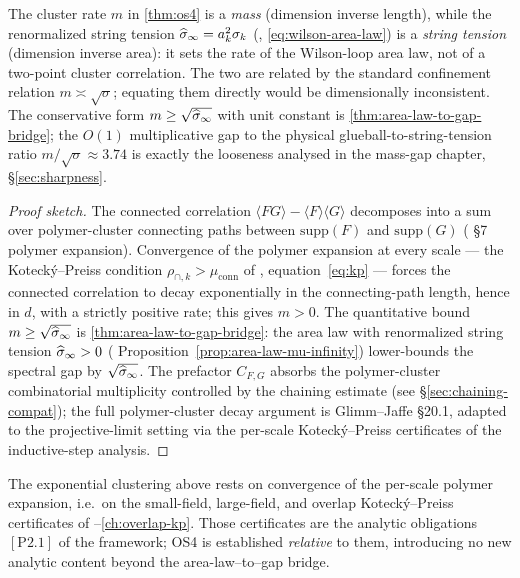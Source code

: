 \begin{remark}
\label{rem:os4-dimensions}
The cluster rate $m$ in \cref{thm:os4} is a \emph{mass} (dimension
inverse length), while the renormalized string tension $\widehat{\sigma}_\infty =
a_k^2 \sigma_k$ (,
\eqref{eq:wilson-area-law}) is a \emph{string tension} (dimension
inverse area): it sets the rate of the Wilson-loop area law, not of a
two-point cluster correlation.  The two are related by the standard
confinement relation $m \asymp \sqrt{\sigma}$; equating them directly
would be dimensionally inconsistent.  The conservative form
$m \ge \sqrt{\widehat{\sigma}_\infty}$ with unit constant is
\cref{thm:area-law-to-gap-bridge}; the $O(1)$ multiplicative gap to
the physical glueball-to-string-tension ratio
$m/\sqrt{\sigma} \approx 3.74$ is exactly the looseness analysed in
the mass-gap chapter, \S\ref{sec:sharpness}.
\end{remark}

\begin{proof}[Proof sketch]
The connected correlation $\langle F G \rangle - \langle F \rangle
\langle G \rangle$ decomposes into a sum over polymer-cluster
connecting paths between $\mathrm{supp}(F)$ and $\mathrm{supp}(G)$
( \S7 polymer expansion).  Convergence of
the polymer expansion at every scale --- the Kotecký--Preiss
condition $\rho_{\cap,k} > \mu_{\mathrm{conn}}$ of
, equation~\eqref{eq:kp} --- forces the
connected correlation to decay exponentially in the
connecting-path length, hence in $d$, with a strictly positive rate;
this gives $m > 0$.  The quantitative bound $m \ge \sqrt{\widehat{\sigma}_\infty}$
is \cref{thm:area-law-to-gap-bridge}: the area law with renormalized
string tension $\widehat{\sigma}_\infty > 0$ (
Proposition~\ref{prop:area-law-mu-infinity}) lower-bounds the
spectral gap by $\sqrt{\widehat{\sigma}_\infty}$.  The prefactor $C_{F,G}$ absorbs
the polymer-cluster combinatorial multiplicity controlled by the
chaining estimate (see \S\ref{sec:chaining-compat}); the full
polymer-cluster decay argument is Glimm--Jaffe \S20.1, adapted to the
projective-limit setting via the per-scale Kotecký--Preiss
certificates of the inductive-step analysis.
\end{proof}

\begin{remark}
\label{rem:os4-conditional}
The exponential clustering above rests on convergence of the
per-scale polymer expansion, i.e.\ on the small-field, large-field,
and overlap Kotecký--Preiss certificates of
--\ref{ch:overlap-kp}.  Those certificates
are the analytic obligations $[\mathrm{P}2.1]$ of the framework; OS4
is established \emph{relative} to them, introducing no new analytic
content beyond the area-law--to--gap bridge.
\end{remark}

